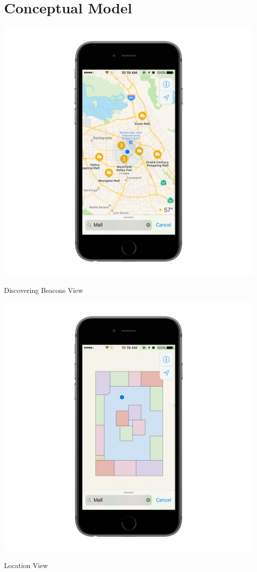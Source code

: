 \chapter{Conceptual Model}
\includegraphics[width=1\textwidth]{images/con1.png}
\caption{Discovering Beacons View}
\includegraphics[width=1\textwidth]{images/con2.png}
\caption{Location View}
